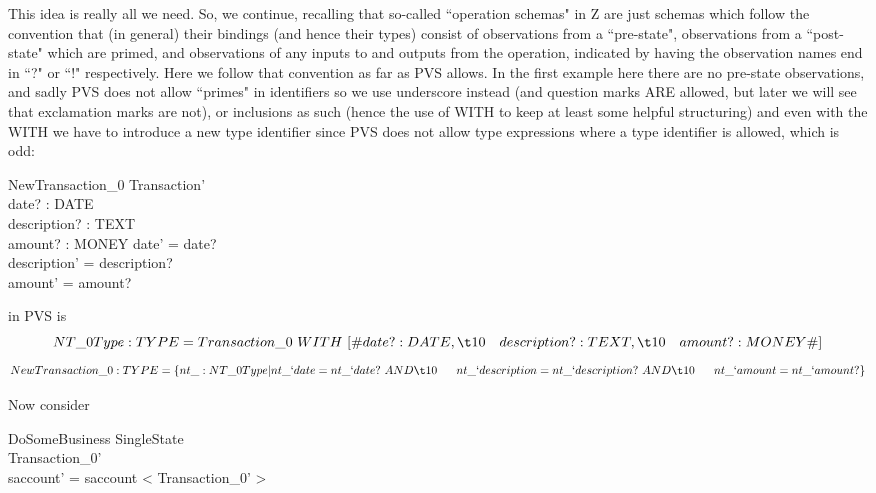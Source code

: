 \documentclass[11pt]{amsart}
\begin{document}
This idea is really all we need. So, we continue, recalling that so-called ``operation schemas" in Z are just schemas which follow the convention that (in general) their bindings (and hence their types) consist of observations from a ``pre-state", observations from a ``post-state" which are primed, and observations of any inputs to and outputs from the operation, indicated by having the observation names end in ``?" or ``!" respectively. Here we follow that convention as far as PVS allows. In the first example here there are no pre-state observations, and sadly PVS does not allow ``primes" in identifiers so we use underscore instead (and question marks ARE allowed, but later we will see that exclamation marks are not), or inclusions as such (hence the use of WITH to keep at least some helpful structuring) and even with the WITH we have to introduce a new type identifier since PVS does not allow type expressions where a type identifier is allowed, which is odd:
\begin{schema}{NewTransaction_0}
Transaction'\\
date? : DATE\\
description? : TEXT\\
amount? : MONEY
\where
date' = date?\\
description' = description?\\
amount' = amount?
\end{schema}
in PVS is
\[NT\_0Type : TYPE = Transaction\_0\ WITH\ [\# date? : DATE, \\
\t10 \ \ \  description? : TEXT, \\
\t10\ \  \ amount? : MONEY \#]
\]
\[
NewTransaction\_0 : TYPE = \{nt\_: NT\_0Type | nt\_`date = nt\_`date?\ AND\\
 \t10       \ \ \   \     \                                 nt\_`description = nt\_`description?\ AND\\
\t10		\ \ \ 	\	\	      nt\_`amount = nt\_`amount? \}
\]

Now consider
\begin{schema}{\Phi DoSomeBusiness}
\Delta SingleState\\
Transaction_0'\\
\where
saccount' = saccount \cat < \theta Transaction_0' >
\end{schema}
\end{document}
